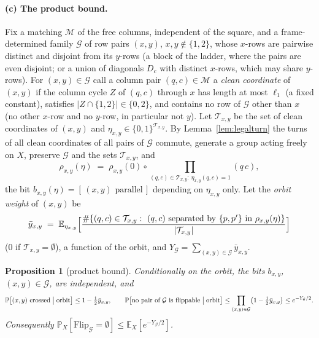 \documentclass[11pt]{article}
\newtheorem{proposition}[theorem]{Proposition}
\theoremstyle{definition}
\newcommand{\E}{\mathbb{E}}
\renewcommand{\Pr}{\mathbb{P}}
\begin{document}
\paragraph{(c) The product bound.}  Fix a matching $\mathcal M$ of the
free columns, independent of the square, and a frame-determined family
$\mathcal G$ of row pairs $(x,y)$, $x,y\notin\{1,2\}$, whose
$x$-rows are pairwise distinct and disjoint from its $y$-rows (a block
of the ladder, where the pairs are even disjoint; or a union of
diagonals $D_c$ with distinct $x$-rows, which may share $y$-rows).
For $(x,y)\in\mathcal G$ call a column pair $(q,c)\in\mathcal M$ a
\emph{clean coordinate} of $(x,y)$ if the column cycle $Z$ of $(q,c)$
through $x$ has length at most $\ell_1$ (a fixed constant), satisfies
$|Z\cap\{1,2\}|\in\{0,2\}$, and contains no row of $\mathcal G$
other than $x$ (no other $x$-row and no $y$-row, in particular not
$y$).  Let $\mathcal T_{x,y}$ be the set of clean coordinates of
$(x,y)$ and $\eta_{x,y}\in\{0,1\}^{\mathcal T_{x,y}}$.  By
Lemma~\ref{lem:legalturn} the turns of all clean coordinates of all
pairs of $\mathcal G$ commute, generate a group acting freely on $X$,
preserve $\mathcal G$ and the sets $\mathcal T_{x,y}$, and
\[
\rho_{x,y}(\eta)\;=\;\rho_{x,y}(0)\circ\!\!\prod_{(q,c)\in\mathcal T_{x,y}:\ \eta_{x,y}(q,c)=1}\!\!(q\,c),
\]
the bit $b_{x,y}(\eta)=[\,(x,y)\text{ parallel}\,]$ depending on
$\eta_{x,y}$ only.  Let the \emph{orbit weight} of $(x,y)$ be
\[
\bar y_{x,y}\;=\;\E_{\eta_{x,y}}\Bigl[\frac{\#\{(q,c)\in\mathcal T_{x,y}:\ (q,c)\text{ separated by }\{p,p'\}\text{ in }\rho_{x,y}(\eta)\}}{|\mathcal T_{x,y}|}\Bigr]
\]
($0$ if $\mathcal T_{x,y}=\emptyset$), a function of the orbit, and
$Y_{\mathcal G}=\sum_{(x,y)\in\mathcal G}\bar y_{x,y}$.

\begin{proposition}[product bound]\label{prop:orbit}
Conditionally on the orbit, the bits $b_{x,y}$, $(x,y)\in\mathcal G$,
are independent, and
\[
\Pr\bigl[(x,y)\text{ crossed}\bigm|\text{orbit}\bigr]\le1-\tfrac12\bar y_{x,y},
\qquad
\Pr\bigl[\text{no pair of }\mathcal G\text{ is flippable}\bigm|\text{orbit}\bigr]
\le\prod_{(x,y)\in\mathcal G}\bigl(1-\tfrac12\bar y_{x,y}\bigr)\le e^{-Y_{\mathcal G}/2}.
\]
Consequently $\Pr_X[\mathrm{Flip}_{\mathcal G}=\emptyset]\le\E_X[e^{-Y_{\mathcal G}/2}]$.
\end{proposition}
\end{document}
